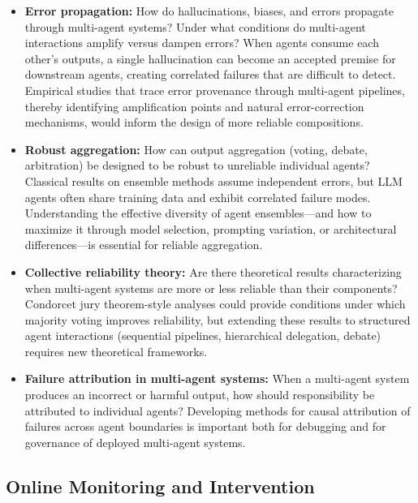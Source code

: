 \documentclass[11pt]{article}
\begin{document}
\begin{itemize}[leftmargin=*]
    \item \textbf{Error propagation:} How do hallucinations, biases, and errors propagate through multi-agent systems?
    Under what conditions do multi-agent interactions amplify versus dampen errors?
    When agents consume each other's outputs, a single hallucination can become an accepted premise for downstream agents, creating correlated failures that are difficult to detect.
    Empirical studies that trace error provenance through multi-agent pipelines, thereby identifying amplification points and natural error-correction mechanisms, would inform the design of more reliable compositions.

    \item \textbf{Robust aggregation:} How can output aggregation (voting, debate, arbitration) be designed to be robust to unreliable individual agents?
    Classical results on ensemble methods assume independent errors, but LLM agents often share training data and exhibit correlated failure modes.
    Understanding the effective diversity of agent ensembles---and how to maximize it through model selection, prompting variation, or architectural differences---is essential for reliable aggregation.

    \item \textbf{Collective reliability theory:} Are there theoretical results characterizing when multi-agent systems are more or less reliable than their components?
    Condorcet jury theorem-style analyses could provide conditions under which majority voting improves reliability, but extending these results to structured agent interactions (sequential pipelines, hierarchical delegation, debate) requires new theoretical frameworks.

    \item \textbf{Failure attribution in multi-agent systems:} When a multi-agent system produces an incorrect or harmful output, how should responsibility be attributed to individual agents?
    Developing methods for causal attribution of failures across agent boundaries is important both for debugging and for governance of deployed multi-agent systems.
\end{itemize}

\subsection{Online Monitoring and Intervention}
\end{document}
